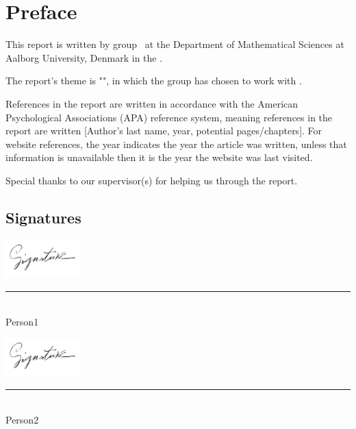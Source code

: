 \chapter*{Preface}\label{Preface}
This report is written by group \projectgroup\, at the Department of Mathematical Sciences at Aalborg University, Denmark in the \MakeLowercase{\projectperiod}.

The report's theme is "\projecttheme", in which the group has chosen to work with \projecttitle.

References in the report are written in accordance with the American Psychological Associations (APA) reference system, meaning references in the report are written [Author's last name, year, potential pages/chapters]. For website references, the year indicates the year the article was written, unless that information is unavailable then it is the year the website was last visited.

Special thanks to our supervisor(s) for helping us through the report.


\section*{Signatures}
\begingroup\centering\vfill\noindent
\begin{minipage}[b]{0.45\textwidth}
 \centering
 \includegraphics[height=1.5cm]{Include/Frontmatter/Signatures/Signature.PNG}
 \textcolor{AAUgrey1}{\rule{\textwidth}{0.75pt}}\\
 Person1\\
 {\footnotesize {}}
\end{minipage}
\hfill
\begin{minipage}[b]{0.45\textwidth}
 \centering
 \includegraphics[height=1.5cm]{Include/Frontmatter/Signatures/Signature.png}
 \textcolor{AAUgrey1}{\rule{\textwidth}{0.75pt}}\\
  Person2\\
 {\footnotesize {}}
\end{minipage}


